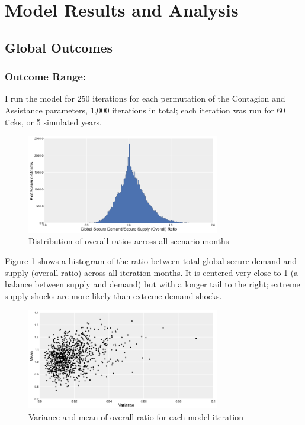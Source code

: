 \documentclass{llncs}
\begin{document}
\section{Model Results and Analysis}

\subsection{Global Outcomes}

\subsubsection{Outcome Range:}

I run the model for 250 iterations for each permutation of the Contagion and Assistance parameters, 1,000 iterations in total; each iteration was run for 60 ticks, or 5 simulated years.

\begin{figure}[h!]
	\centering
	\includegraphics[width=0.75\textwidth]{Figures/OverallDistribution_lg}
	\caption{Distribution of overall ratios across all scenario-months}

\end{figure}

Figure 1 shows a histogram of the ratio between total global secure demand and supply (overall ratio) across all iteration-months. It is centered very close to 1 (a balance between supply and demand) but with a longer tail to the right; extreme supply shocks are more likely than extreme demand shocks.

\begin{figure}[h!]
	\centering
	\includegraphics[width=0.75\textwidth]{Figures/OverallVarMeanScatter_lg}
	\caption{Variance and mean of overall ratio for each model iteration}
\end{figure}
\end{document}
